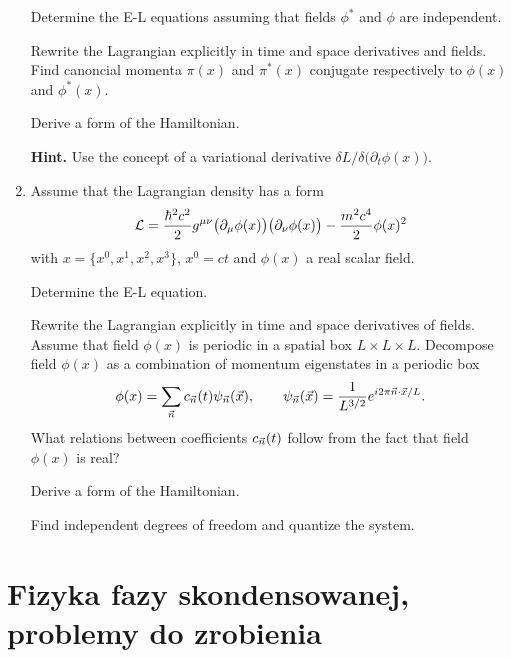 \documentclass[a4paper,11pt]{article}
\begin{document}
\begin{enumerate}
  Determine the E-L equations assuming that fields $\phi^{ * }$ and
  $\phi$ are independent.

  Rewrite the Lagrangian explicitly in time and space derivatives and
  fields. Find canoncial momenta $\pi( x )$ and $\pi^{ * }( x )$
  conjugate respectively to $\phi( x )$ and $\phi^{ * }( x )$.

  Derive a form of the Hamiltonian.

  \textbf{Hint.} Use the concept of a variational derivative
  $\delta L / \delta \big( \partial_{ t } \phi( x ) \big)$.

\item Assume that the Lagrangian density has a form
  \begin{equation}
    \label{eq:QM38}
    \mathcal{L} =
    \frac{ \hbar^{ 2 } c^{ 2 } }{ 2 } g^{ \mu \nu }
    \big( \partial_{ \mu } \phi( x ) \big) \big( \partial_{ \nu } \phi( x ) \big)
    - \frac{ m^{ 2 } c^{ 4 } }{ 2 } \phi( x )^{ 2 }
  \end{equation}
  with $x = \{ x^{ 0 }, x^{ 1 }, x^{ 2 }, x^{ 3 } \}$, $x^{ 0 } = c t$
  and $\phi( x )$ a real scalar field.

  Determine the E-L equation.

  Rewrite the Lagrangian explicitly in time and space derivatives of
  fields. Assume that field $\phi( x )$ is periodic in a spatial box
  $L \times L \times L$. Decompose field $\phi( x )$ as a combination
  of momentum eigenstates in a periodic box
  \begin{equation}
    \label{eq:QM39}
    \phi( x ) =
    \sum_{ \vec{ n } } c_{ \vec{ n } }( t ) \psi_{ \vec{ n } }( \vec{ x } ), \qquad
    \psi_{ \vec{ n } }( \vec{ x } ) =
    \frac{ 1 }{ L^{ 3 / 2 } } e^{ i 2\pi \vec{ n } \cdot \vec{ x } / L }.
  \end{equation}
  What relations between coefficients $c_{ \vec{ n } }( t )$ follow from
  the fact that field $\phi( x )$ is real?

  Derive a form of the Hamiltonian.

  Find independent degrees of freedom and quantize the system.

\end{enumerate}










\section{Fizyka fazy skondensowanej, problemy do zrobienia}
\end{document}
